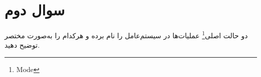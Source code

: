 \section{سوال دوم}
دو حالت اصلی\footnote{Mode} عملیات‌ها در سیستم‌عامل را نام برده و هرکدام را به‌صورت مختصر توضیح دهید.

\begin{qsolve}
	
\end{qsolve}